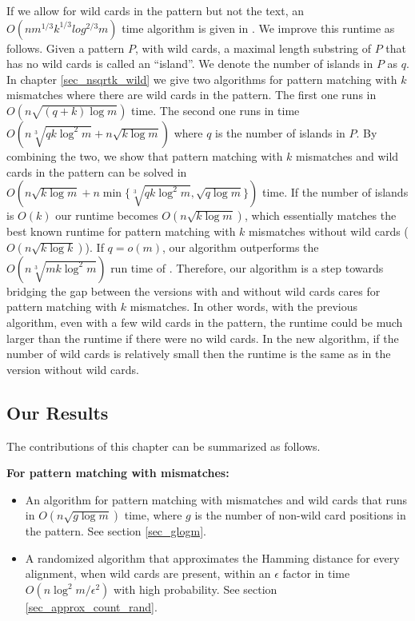 If we allow for wild cards in the pattern but not the text, an 
$O(nm^{1/3}k^{1/3}log^{2/3}m)$ time algorithm is given in \cite{CP10}.
We improve this runtime as follows.  Given a pattern $P$, with wild cards, a
maximal length substring of $P$ that has no wild cards is called an ``island''.
We denote the number of islands in $P$ as $q$. In chapter 
\ref{sec_nsqrtk_wild} we give two algorithms for pattern matching with $k$
mismatches where there are wild cards in the pattern.
The first one runs in $O(n\sqrt{(q+k)\log m})$ time. 
The second one runs in time $O(n\sqrt[3]{qk\log^2 m} +
n\sqrt{k\log m})$ where $q$ is the number of islands in $P$. By combining the
two, we show that pattern matching with $k$ mismatches and wild cards in the
pattern can be solved in $O(n\sqrt{k\log m}+n\min\{\sqrt[3]{qk\log^2 m},\sqrt{q\log m}\})$ time.
If the number of islands is $O(k)$ our runtime becomes $O(n\sqrt{k \log m})$,
which essentially matches the best known runtime for pattern matching with $k$
mismatches without wild cards ($O(n\sqrt{k\log k})$). 
 If $q=o(m)$, our algorithm outperforms the
$O(n\sqrt[3]{mk\log^2m})$ run time of \cite{CP07}.  
Therefore, our algorithm is a step
towards bridging the gap between the versions with and without wild cards
cares for pattern matching with $k$ mismatches. 
In other words, with the
previous algorithm, even with a few wild cards in the pattern, the
runtime could be much larger than the runtime if there were no wild cards.
In the new algorithm, if the number of wild cards is relatively small
then the runtime is the same as in the version without wild cards.



\subsection{Our Results}

The contributions of this chapter can be summarized as follows.

{\bf For pattern matching with mismatches:}
\begin{itemize}
\item An algorithm  for pattern matching with mismatches
and wild cards that runs in $O(n \sqrt{g \log m})$ time, where $g$ is the
number of non-wild card positions in the pattern. See section \ref{sec_glogm}.

\item A randomized algorithm that approximates the Hamming distance for every
alignment, when wild cards are present, within an $\epsilon$ factor in time
$O(n\log^2m/\epsilon^2)$ with high probability. See section
\ref{sec_approx_count_rand}.
\end{itemize}

